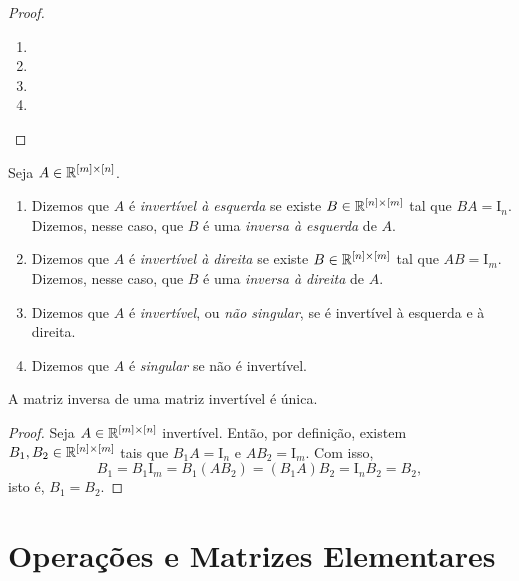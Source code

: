 \begin{proof}
    \leavevmode
        \begin{enumerate}[leftmargin=*, align=left, label=\textbf{(\alph*)}]
            \item
            \item
            \item
            \item
        \end{enumerate}
\end{proof}

\begin{definition}
    Seja $A \in \mathbb{R}^{[m] \times [n]}$.
        \begin{enumerate}[leftmargin=*, align=left, label=\textbf{(\alph*)}]
            \item Dizemos que $A$ é \emph{invertível à esquerda} se existe $B \in \mathbb{R}^{[n] \times [m]}$ tal que $BA=\mathrm{I}_n$. Dizemos, nesse caso, que $B$ é uma \emph{inversa à esquerda} de $A$.
            \item Dizemos que $A$ é \emph{invertível à direita} se existe $B \in \mathbb{R}^{[n] \times [m]}$ tal que $AB = \mathrm{I}_m$. Dizemos, nesse caso, que $B$ é uma \emph{inversa à direita} de $A$.
            \item Dizemos que $A$ é \emph{invertível}, ou \emph{não singular}, se é invertível à esquerda e à direita.
            \item Dizemos que $A$ é \emph{singular} se não é invertível. 
        \end{enumerate}
\end{definition}

\begin{proposition}
    A matriz inversa de uma matriz invertível é única.
\end{proposition}

\begin{proof} 
    Seja $A \in \mathbb{R}^{[m] \times [n]}$ invertível. Então, por definição, existem $B_1, B_2 \in \mathbb{R}^{[n] \times [m]}$ tais que $B_1 A = \mathrm{I}_n$ e $A B_2 = \mathrm{I}_{m}$. Com isso,
        \[
            B_1 = B_1 \mathrm{I}_{m} = B_1 (A B_2) = (B_1 A) B_2 = \mathrm{I}_{n} B_2 = B_2,
        \]
    isto é, $B_1 = B_2$. \blackproof
\end{proof}

\section{Operações e Matrizes Elementares}


